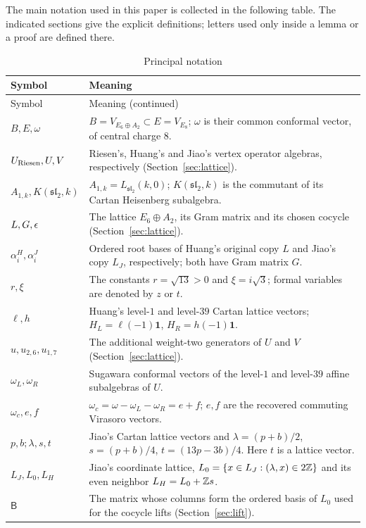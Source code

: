 \documentclass[11pt,reqno]{amsart}
\theoremstyle{definition}\newtheorem{definition}[theorem]{Definition}
\theoremstyle{remark}\newtheorem{remark}[theorem]{Remark}
\newcommand{\one}{\mathbf1}\newcommand{\slc}{\mathfrak{sl}_2}
\numberwithin{equation}{section}
\begin{document}
The main notation used in this paper is collected in the following table. The indicated sections give the explicit definitions; letters used only inside a lemma or a proof are defined there.
\begingroup\small
\renewcommand{\arraystretch}{1.12}
\begin{longtable}{@{}p{}p{}@{}}
\caption{Principal notation}\label{tab:notation}\\
\toprule Symbol & Meaning\\\midrule\endfirsthead
\toprule Symbol & Meaning (continued)\\\midrule\endhead
\bottomrule\endfoot
$B,E,\omega$ & $B=V_{E_6\oplus A_2}\subset E=V_{E_8}$; $\omega$ is their common conformal vector, of central charge $8$.\\
$U_{\rm Riesen},U,V$ & Riesen's, Huang's and Jiao's vertex operator algebras, respectively (Section~\ref{sec:lattice}).\\
$A_{1,k},K(\slc,k)$ & $A_{1,k}=L_{\slc}(k,0)$; $K(\slc,k)$ is the commutant of its Cartan Heisenberg subalgebra.\\
$L,G,\epsilon$ & The lattice $E_6\oplus A_2$, its Gram matrix and its chosen cocycle (Section~\ref{sec:lattice}).\\
{$\alpha_i^H,\alpha_i^J$} & {Ordered root bases of Huang's original copy $L$ and Jiao's copy $L_J$, respectively; both have Gram matrix $G$.}\\
$r,\xi$ & The constants $r=\sqrt{13}>0$ and $\xi=i\sqrt3$; formal variables are denoted by $z$ or $t$.\\
$\ell,h$ & Huang's level-$1$ and level-$39$ Cartan lattice vectors; $H_L=\ell(-1)\one$, $H_R=h(-1)\one$.\\
$u,u_{2,6},u_{1,7}$ & The additional weight-two generators of $U$ and $V$ (Section~\ref{sec:lattice}).\\
$\omega_L,\omega_R$ & Sugawara conformal vectors of the level-$1$ and level-$39$ affine subalgebras of $U$.\\
$\omega_c,e,f$ & $\omega_c=\omega-\omega_L-\omega_R=e+f$; $e,f$ are the recovered commuting Virasoro vectors.\\
$p,b;\lambda,s,t$ & Jiao's Cartan lattice vectors and $\lambda=(p+b)/2$, $s=(p+b)/4$, $t=(13p-3b)/4$. Here $t$ is a lattice vector.\\
$L_J,L_0,L_H$ & Jiao's coordinate lattice, $L_0=\{x\in L_J:(\lambda,x)\in2\mathbb Z\}$ and its even neighbor $L_H=L_0+\mathbb Z s$.\\
$\mathsf B$ & The matrix whose columns form the ordered basis of $L_0$ used for the cocycle lifts (Section~\ref{sec:lift}).\\

\end{longtable}
\end{document}
